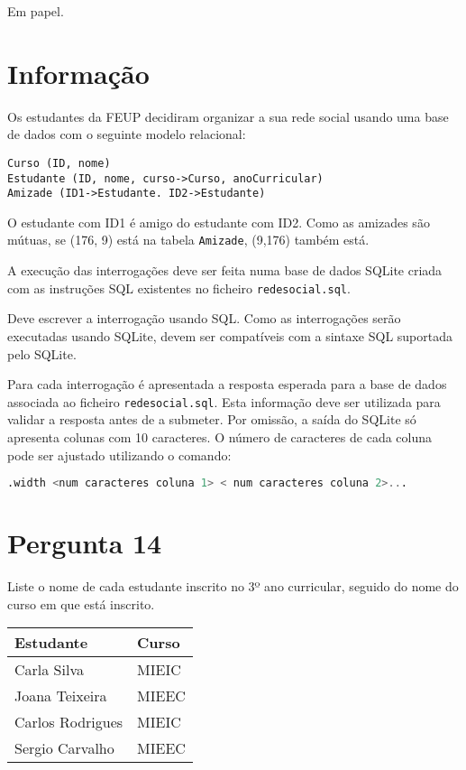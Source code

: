 \ansseparator

Em papel.

\section*{Informação}

Os estudantes da FEUP decidiram organizar a sua rede social usando uma base de dados com o seguinte modelo relacional:

\begin{lstlisting}[numbers=none]
Curso (ID, nome)
Estudante (ID, nome, curso->Curso, anoCurricular)
Amizade (ID1->Estudante. ID2->Estudante)
\end{lstlisting}

O estudante com ID1 é amigo do estudante com ID2. Como as amizades são mútuas, se (176, 9) está na tabela \texttt{Amizade}, (9,176) também está.

A execução das interrogações deve ser feita numa base de dados SQLite criada com as instruções SQL existentes no ficheiro \texttt{redesocial.sql}.

Deve escrever a interrogação usando SQL. Como as interrogações serão executadas usando SQLite, devem ser compatíveis com a sintaxe SQL suportada pelo SQLite.

Para cada interrogação é apresentada a resposta esperada para a base de dados associada ao ficheiro \texttt{redesocial.sql}. Esta informação deve ser utilizada para validar a resposta antes de a submeter. Por omissão, a saída do SQLite só apresenta colunas com 10 caracteres. O número de caracteres de cada coluna pode ser ajustado utilizando o comando:

\begin{lstlisting}[language=SQL,numbers=none]
.width <num caracteres coluna 1> < num caracteres coluna 2>...
\end{lstlisting}

\section{Pergunta 14}
Liste o nome de cada estudante inscrito no 3º ano curricular, seguido do nome do curso em que está inscrito.
\begin{center} \begin{tabular}{l | l}
    \textbf{Estudante} & \textbf{Curso} \\ \hline
    Carla Silva        & MIEIC          \\
    Joana Teixeira     & MIEEC          \\
    Carlos Rodrigues   & MIEIC          \\
    Sergio Carvalho    & MIEEC
\end{tabular} \end{center}
\ansseparator


